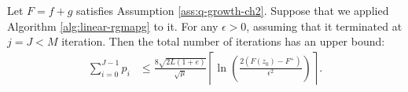 \documentclass[12pt]{report}
\begin{document}
        \begin{theorem}\label{thm:rgmapg-total-itr-bnds}
            Let $F = f + g$ satisfies Assumption \ref{ass:q-growth-ch2}. 
            Suppose that we applied Algorithm \ref{alg:linear-rgmapg} to it. 
            For any $\epsilon > 0$, assuming that it terminated at $j = J < M$ iteration.
            Then the total number of iterations has an upper bound:
            \begin{align*}
                \sum_{i = 0}^{J - 1}p_i &\le 
                \frac{8\sqrt{2L(1 + e)}}{\sqrt{\mu}} \left\lceil 
                \ln \left(
                    \frac{2(F(z_0) - F^+)}{\epsilon^2}
                \right) 
                \right\rceil. 
            \end{align*}
        \end{theorem}
\end{document}
